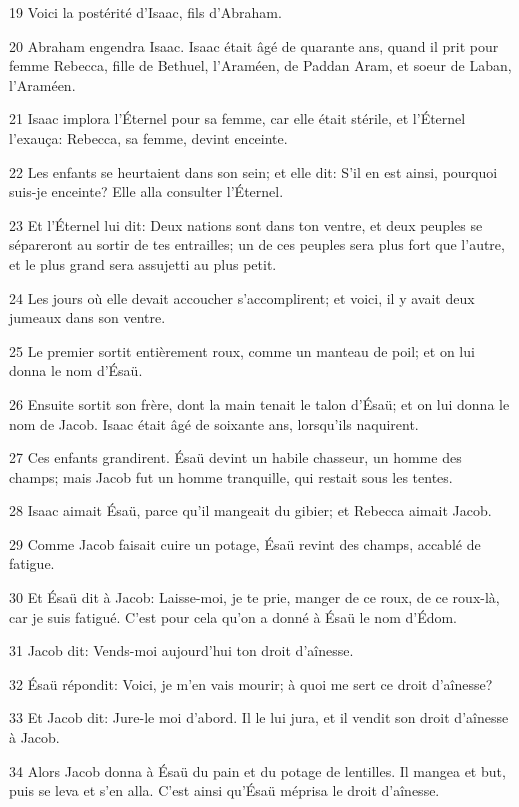 \par 19 Voici la postérité d'Isaac, fils d'Abraham.
\par 20 Abraham engendra Isaac. Isaac était âgé de quarante ans, quand il prit pour femme Rebecca, fille de Bethuel, l'Araméen, de Paddan Aram, et soeur de Laban, l'Araméen.
\par 21 Isaac implora l'Éternel pour sa femme, car elle était stérile, et l'Éternel l'exauça: Rebecca, sa femme, devint enceinte.
\par 22 Les enfants se heurtaient dans son sein; et elle dit: S'il en est ainsi, pourquoi suis-je enceinte? Elle alla consulter l'Éternel.
\par 23 Et l'Éternel lui dit: Deux nations sont dans ton ventre, et deux peuples se sépareront au sortir de tes entrailles; un de ces peuples sera plus fort que l'autre, et le plus grand sera assujetti au plus petit.
\par 24 Les jours où elle devait accoucher s'accomplirent; et voici, il y avait deux jumeaux dans son ventre.
\par 25 Le premier sortit entièrement roux, comme un manteau de poil; et on lui donna le nom d'Ésaü.
\par 26 Ensuite sortit son frère, dont la main tenait le talon d'Ésaü; et on lui donna le nom de Jacob. Isaac était âgé de soixante ans, lorsqu'ils naquirent.
\par 27 Ces enfants grandirent. Ésaü devint un habile chasseur, un homme des champs; mais Jacob fut un homme tranquille, qui restait sous les tentes.
\par 28 Isaac aimait Ésaü, parce qu'il mangeait du gibier; et Rebecca aimait Jacob.
\par 29 Comme Jacob faisait cuire un potage, Ésaü revint des champs, accablé de fatigue.
\par 30 Et Ésaü dit à Jacob: Laisse-moi, je te prie, manger de ce roux, de ce roux-là, car je suis fatigué. C'est pour cela qu'on a donné à Ésaü le nom d'Édom.
\par 31 Jacob dit: Vends-moi aujourd'hui ton droit d'aînesse.
\par 32 Ésaü répondit: Voici, je m'en vais mourir; à quoi me sert ce droit d'aînesse?
\par 33 Et Jacob dit: Jure-le moi d'abord. Il le lui jura, et il vendit son droit d'aînesse à Jacob.
\par 34 Alors Jacob donna à Ésaü du pain et du potage de lentilles. Il mangea et but, puis se leva et s'en alla. C'est ainsi qu'Ésaü méprisa le droit d'aînesse.

